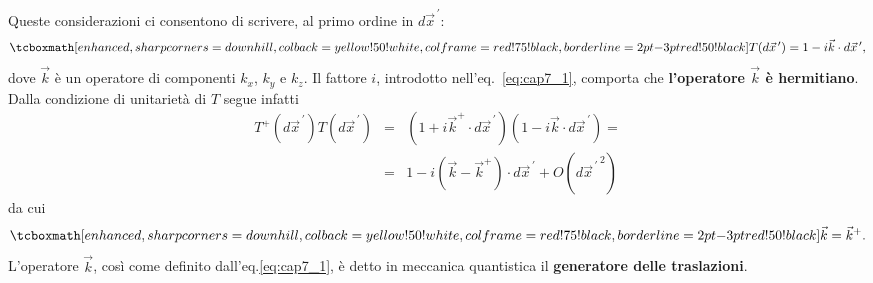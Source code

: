 Queste considerazioni ci consentono di scrivere, al primo ordine in $d{\vec{x}}^{\, \prime}$:
	\begin{equation}
		\label{eq:cap7_1}
		\tcboxmath[enhanced,sharp corners=downhill ,colback=yellow!50!white,colframe=red!75!black, borderline={2pt}{-3pt}{red!50!black}]{
			T(d{\vec{x}}^{\, \prime})=1-i\vec{k}\cdot d{\vec{x}}^{\, \prime} ,
			}
	\end{equation}
dove $\vec{k}$ è un operatore di componenti $k_x$, $k_y$ e $k_z$. Il fattore $i$, introdotto nell'eq.~\eqref{eq:cap7_1}, comporta che \textbf{l'operatore ${\vec{k}}$ è hermitiano}. Dalla condizione di unitarietà di $T$ segue infatti
	\begin{eqnarray}
		T^+(d{\vec{x}}^{\, \prime}) T(d{\vec{x}}^{\, \prime}) & = & \left(1+i\vec{k}^{+}\cdot d{\vec{x}}^{\, \prime}\right) \left(1-i\vec{k}\cdot d{\vec{x}}^{\, \prime}\right) = \nonumber \\ 
		& = & 1-i\left(\vec{k}-\vec{k}^{+}\right)\cdot d{\vec{x}}^{\, \prime}+O({d{\vec{x}}^{\, \prime} }^{\, 2}) 
	\end{eqnarray}
da cui
	\begin{equation}
		\tcboxmath[enhanced,sharp corners=downhill ,colback=yellow!50!white,colframe=red!75!black, borderline={2pt}{-3pt}{red!50!black}]{	
			\vec{k}=\vec{k}^+ .
			}
	\end{equation}
L'operatore $\vec{k}$, così come definito dall'eq.\eqref{eq:cap7_1}, è detto in meccanica quantistica il \textbf{generatore delle traslazioni}.\\

